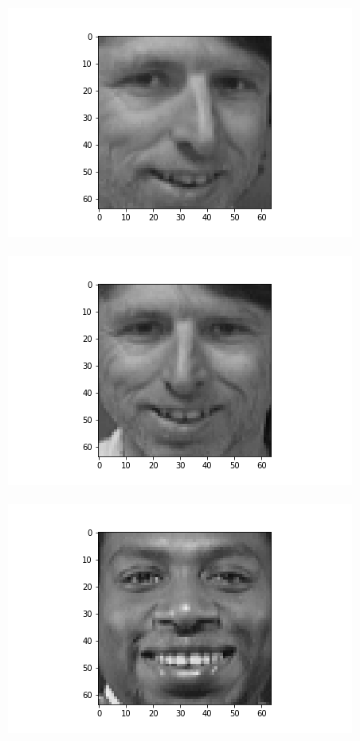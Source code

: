 \documentclass[12pt, a4paper]{article}
\begin{document}
\begin{figure}[h]
\begin{subfigure}{0.3\linewidth}
    \end{subfigure}
    \newline
    \begin{subfigure}{0.3\linewidth}
        \centering
        \includegraphics[width=\linewidth]{images/q3/c/6/3.png}
    \end{subfigure}
    \hfill
    \begin{subfigure}{0.3\linewidth}
        \centering
        \includegraphics[width=\linewidth]{images/q3/c/6/4.png}
    \end{subfigure}
    \hfill
    \begin{subfigure}{0.3\linewidth}
        \centering
        \includegraphics[width=\linewidth]{images/q3/c/6/5.png}

\end{subfigure}
\end{figure}
\end{document}
